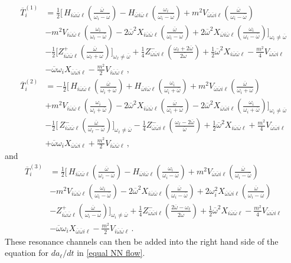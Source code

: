 \documentclass[letterpaper,11pt]{article}
\newcommand{\oi}{\omega_i}
\newcommand{\ol}{\omega_\ell}
\newcommand{\ob}{\overline{\omega}}
\begin{document}
\begin{align}
\overline{T}^{(1)}_{i} &= \frac{1}{2} \bigg[ \, H_{i\ob\ob\ell} \left( \frac{\ob}{\oi - \ob} \right) - H_{\ob i \ob\ell} \left( \frac{\oi}{\oi - \ob} \right) + m^2 V_{\ob\ob i\ell} \left( \frac{\ob}{\oi - \ob} \right) \nonumber \\
%
& - m^2 V_{i \ob\ob\ell} \left( \frac{\oi}{\oi - \ob} \right) - 2 \ob^2 X_{i\ob\ob\ell} \left( \frac{\ob}{\oi - \ob} \right) + 2 \ob^2 X_{\ob i \ob\ell} \left( \frac{\oi}{\oi - \ob} \right) \bigg]_{\oi \neq \ob} \nonumber \\
%
& -\frac{1}{2} \bigg[ Z^+_{i\ob\ob\ell} \left( \frac{\ob}{\ol + \ob} \right) \bigg]_{\ol \neq \ob} \!\! + \frac{1}{4} Z^-_{\ob\ob i \ell} \left( \frac{\ol + 2\ob}{2 \ob} \right) + \frac{1}{2} \ob^2 X_{i\ob\ob\ell} - \frac{m^2}{4} V_{\ob\ob i \ell} \nonumber \\
%
& - \ob \oi X_{\ob\ob i\ell} - \frac{m^2}{2} V_{i \ob\ob\ell} \, ,
\end{align}
\begin{align}
\overline{T}^{(2)}_{i} &=  - \frac{1}{2} \bigg[ \, H_{i\ob\ob \ell} \left( \frac{\ob}{\oi + \ob} \right) + H_{\ob i \ob \ell} \left( \frac{\oi}{\oi + \ob} \right) + m^2 V_{\ob \ob i \ell} \left( \frac{\ob}{\oi + \ob} \right) \nonumber \\
%
& + m^2 V_{i\ob\ob\ell} \left( \frac{\oi}{\oi + \ob} \right) - 2 \ob^2 X_{i \ob\ob\ell} \left( \frac{\ob}{\oi + \ob} \right) - 2 \ob^2 X_{\ob\ob i\ell} \left( \frac{\oi}{\oi + \ob} \right) \bigg]_{\oi \neq \ob} \nonumber \\
%
& - \frac{1}{2} \bigg[ \, Z^{-}_{i \ob \ob \ell} \left( \frac{\ob}{\ol - \ob} \right) \bigg]_{\ol \neq \ob} \!\!\!\! - \frac{1}{4} Z^-_{\ob\ob i \ell} \left( \frac{\ol - 2\ob}{\ob} \right) + \frac{1}{2} \ob^2 X_{i\ob\ob\ell} + \frac{m^2}{4} V_{\ob\ob i\ell} \nonumber \\
%
& + \ob \oi X_{\ob\ob i \ell} + \frac{m^2}{2} V_{i \ob\ob \ell} \, ,
\end{align}
and
\begin{align}
\overline{T}^{(3)}_{i} &= \frac{1}{2} \bigg[ \, H_{i\ob\ob\ell} \left( \frac{\ob}{\oi - \ob} \right) - H_{\ob i \ob\ell} \left( \frac{\oi}{\oi - \ob} \right) + m^2 V_{\ob\ob i \ell} \left( \frac{\ob}{\oi - \ob} \right) \nonumber \\
%
& - m^2 V_{i\ob\ob\ell} \left( \frac{\oi}{\oi - \ob} \right) - 2 \ob^2 X_{i\ob\ob\ell} \left( \frac{\ob}{\oi-\ob} \right) + 2 \oi^2 X_{\ob\ob i\ell} \left( \frac{\ob}{\oi-\ob} \right) \nonumber \\
%
& - Z^+_{i\ob\ob\ell} \left( \frac{\ob}{\oi - \ob} \right) \bigg]_{\oi \neq \ob} + \frac{1}{4} Z^-_{\ob\ob i \ell} \left( \frac{2\ob - \ol}{2\ob} \right) + \frac{1}{2} \ob^2 X_{i\ob\ob\ell} - \frac{m^2}{4} V_{\ob\ob i\ell} \nonumber \\
%
&  - \ob \oi X_{\ob\ob i\ell} - \frac{m^2}{2} V_{i\ob\ob\ell} \, .
\end{align}
These resonance channels can then be added into the right hand side of the equation for $d a_\ell / d t$ in \eqref{equal NN flow}.





\end{document}
